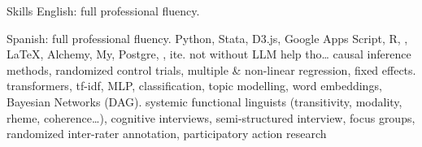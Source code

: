 
\begin{rubric}{Skills}
\entry*[Languages]
	English: full professional fluency. \par Spanish: full professional fluency.
	Python, Stata, D3.js, Google Apps Script, R, , \LaTeX, 
\entry*[Databases]
	Alchemy, My, Postgre, , ite. \tiny{not without LLM help tho\ldots}
	causal inference methods, randomized control trials, multiple \& non-linear regression, fixed effects.
	transformers, tf-idf, MLP, classification, topic modelling, word embeddings, Bayesian Networks (DAG).
	systemic functional linguists (transitivity, modality, rheme, coherence\ldots), cognitive interviews, semi-structured interview, focus groups, randomized inter-rater annotation, participatory action research
\end{rubric}
